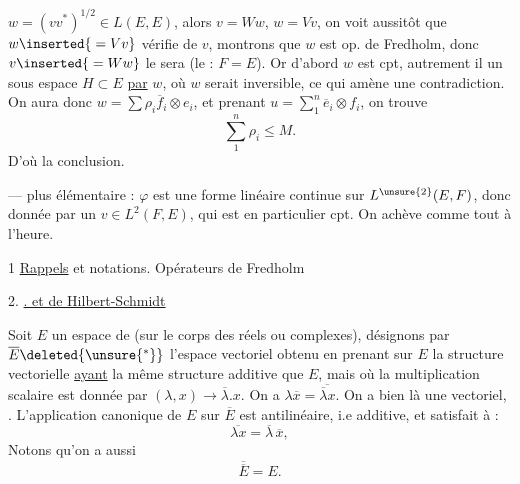 $w=(vv^*)^{1/2}\in L(E,E)$, alors $v=Ww$, $w=Vv$, on voit aussitôt que $w\inserted{{}=Vv}$  vérifie  de $v$, montrons que $w$ est op. de Fredholm, donc $v\inserted{{}=Ww}$ le sera (le  : $F=E$).
Or  d'abord $w$ est cpt,  autrement il  un sous espace $H\subset E$ \uline{}  \uline{par}  $w$, où $w$ serait inversible, ce qui amène une contradiction.
On aura donc $w=\sum\rho_i\overline f_i\otimes e_i$, et prenant $u=\sum_1^n\overline e_i\otimes f_i$, on trouve
\[
\sum_1^n\rho_i\leq M.
\]
D'où la conclusion.

---   plus élémentaire : $\varphi$ est une forme linéaire continue sur $L^{\unsure{2}}(E,F)$, donc donnée par un $v\in L^2(F,E)$, qui est en particulier cpt. On achève comme tout à l'heure.

1 \uline{Rappels}  et notations. Opérateurs de Fredholm

2. \uline{.  et de Hilbert-Schmidt}

Soit $E$ un espace de  (sur le corps des réels ou complexes), désignons par $\overline E\deleted{\unsure{{}^*}}$ l'espace  vectoriel obtenu en prenant sur $E$ la structure vectorielle \uline{ayant} la même structure additive que $E$, mais où la multiplication scalaire est donnée par $(\lambda,x)\longrightarrow\overline\lambda.x$.
On a $\lambda\overline x=\overline{\overline\lambda x}$.
On a bien là une   vectoriel, .
L'application canonique  de $E$ sur $\overline E$ est antilinéaire, i.e  additive, et satisfait à :
\[
\overline{\lambda x}=\overline\lambda\,\overline x,
\]
Notons qu'on a aussi
\[
\overline{\overline E}=E.
\]

